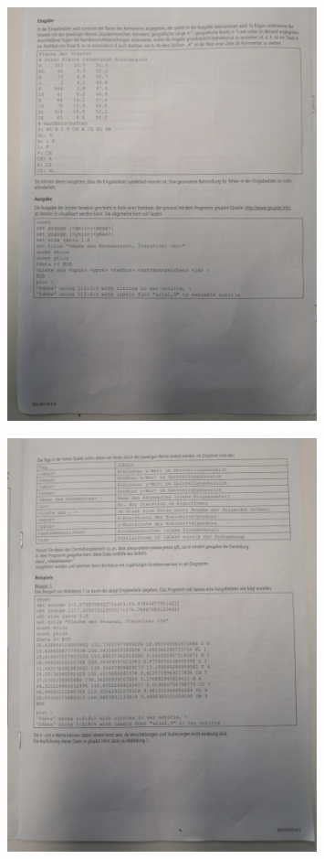 \begin{figure}[htb]
    \centering
    \includegraphics[width=0.8\textwidth,]{./aufgabenstellung/4.jpg}
\end{figure}

\begin{figure}[htb]
    \centering
    \includegraphics[width=0.8\textwidth,]{./aufgabenstellung/5.jpg}
\end{figure}

